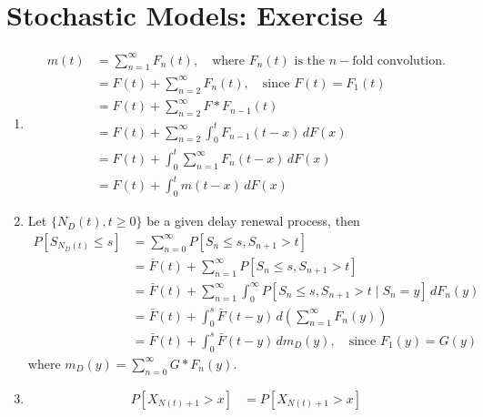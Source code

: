 \documentclass[a4paper,10pt]{article}
\theoremstyle{definition}
\begin{document}
\section*{Stochastic Models: Exercise 4}

\begin{enumerate}
\item 
\begin{align*}
m(t) &= \sum_{n=1}^{\infty}F_n(t),\quad \text{where $F_n(t)$ is the $n-$fold convolution.}\\
&=F(t) + \sum_{n=2}^{\infty}F_n(t) ,\quad\text{since $F(t)=F_1(t)$}\\
&=F(t)+\sum_{n=2}^{\infty} F \ast F_{n-1}(t)\\
&=F(t)+\sum_{n=2}^{\infty} \int_{0}^{t} F_{n-1}(t-x)\,dF(x)\\
&=F(t)+\int_{0}^{t} \sum_{n=1}^{\infty} F_{n}(t-x)\,dF(x)\\
&=F(t)+\int_{0}^{t} m(t-x)\,dF(x)
\end{align*}

\item Let $\{N_D(t), t \geq 0\}$ be a given delay renewal process, then
\begin{align*}
P\left[S_{N_D(t)}\leq s\right] &=\sum_{n=0}^{\infty}P\left[S_{n}\leq s, S_{n+1}>t\right]\\
&=\bar{F}(t)+\sum_{n=1}^{\infty}P\left[S_{n}\leq s, S_{n+1}>t\right]\\
&=\bar{F}(t)+\sum_{n=1}^{\infty}\int_{0}^{\infty}P\left[S_{n}\leq s, S_{n+1}>t\mid S_n=y\right]\,dF_n(y)\\
&=\bar{F}(t)+\int_{0}^{s}\bar{F}(t-y)\,d\left(\sum_{n=1}^{\infty}F_n(y)\right)\\
&=\bar{F}(t)+\int_{0}^{s}\bar{F}(t-y)\,dm_D(y),\quad \text{since $F_1(y)=G(y)$}
\end{align*}
where $m_D(y)=\sum_{n=0}^{\infty}G \ast F_{n}(y)$.

\item
\begin{align*}
P\left[X_{N(t)+1}>x\right]&=P\left[X_{N(t)+1}>x\right]
\end{align*}



\end{enumerate}
\end{document}
